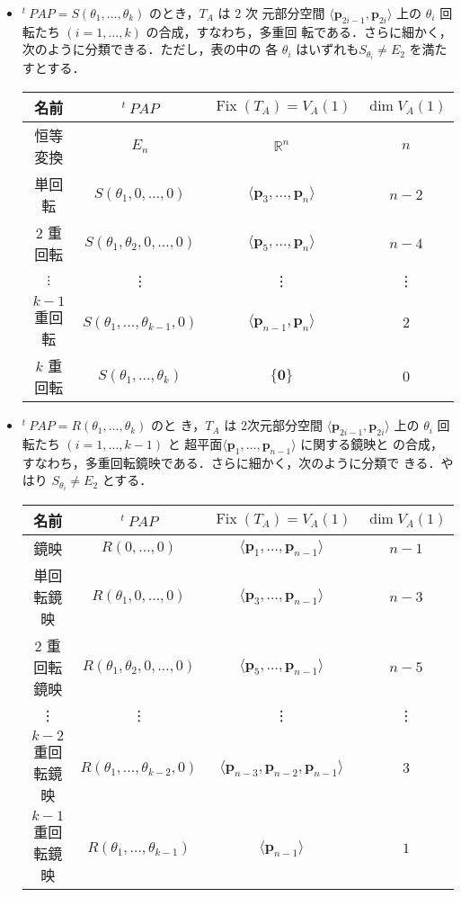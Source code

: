 \documentclass[11pt, uplatex, dvipdfmx, titlepage]{jsarticle}
\newcommand{\trs}[1]{{}^{t}~\!\!#1}
\DeclareMathOperator{\Fix}{Fix}
\theoremstyle{definition}
\begin{document}
\begin{itemize}
\setlength{\itemsep}{1zh}

\item $\trs{P}AP=S(\theta_1, \ldots, \theta_k)$ のとき，$T_A$ は $2$ 次
  元部分空間 $\langle \bm{p}_{2i-1}, \bm{p}_{2i}\rangle
  $ 上の $\theta_i$ 回転たち $(i=1,\ldots, k)$ の合成，すなわち，多重回
  転である．さらに細かく，次のように分類できる．ただし，表の中の
  各 $\theta_i$ はいずれも$ S_{\theta_i} \neq E_2$ を満たすとする．
  \begin{table}[h]
    \centering
    \begin{tabular}[h]{c|c|c|c}
      名前 & $\trs{P}AP$ & $\Fix(T_A)=V_A(1)$ & $\dim V_A(1)$\\ \hline
      恒等変換 & $E_n$ & $\mathbb{R}^n$ & $n$ \\
      単回転 & $S(\theta_1, 0, \ldots, 0)$
                         & $\langle \bm{p}_3, \ldots, \bm{p}_n\rangle $ & $n-2$ \\
      $2$ 重回転 & $S(\theta_1, \theta_2, 0, \ldots, 0)$
                         & $\langle \bm{p}_5, \ldots, \bm{p}_n\rangle$ & $n-4$ \\
      $\vdots$ & \vdots & \vdots & \vdots \\
      $k-1$ 重回転 & $S(\theta_1, \ldots, \theta_{k-1}, 0)$
                         & $\langle \bm{p}_{n-1}, \bm{p}_n \rangle$ & $2$ \\
      $k$ 重回転 & $S(\theta_1, \ldots, \theta_k) $ & $\{\bm{0}\}$ & $0$
    \end{tabular}
  \end{table}

\item $\trs{P}AP = R(\theta_1, \ldots, \theta_k)$ のと
  き，$T_A$ は $2$次元部分空間 $\langle \bm{p}_{2i-1},
  \bm{p}_{2i}\rangle $ 上の $\theta_i$ 回転たち $(i=1,\ldots, k-1)$ と
  超平面$\langle \bm{p}_1, \ldots, \bm{p}_{n-1}\rangle$ に関する鏡映と
  の合成，すなわち，多重回転鏡映である．さらに細かく，次のように分類で
  きる．やはり $S_{\theta_i} \neq E_2$ とする．
  \begin{table}[h]
    \centering
    \begin{tabular}[h]{c|c|c|c}
      名前 & $\trs{P}AP$ & $\Fix(T_A)= V_A(1)$ & $\dim V_A(1)$ \\ \hline
      鏡映 & $R(0, \ldots, 0)$ & $\langle \bm{p}_1, \ldots, \bm{p}_{n-1}\rangle$  & $n-1$ \\
      単回転鏡映 & $R(\theta_1, 0, \ldots, 0)$
                         & $\langle \bm{p}_3, \ldots,  \bm{p}_{n-1}\rangle$ & $n-3$\\
      $2$ 重回転鏡映 & $R(\theta_1, \theta_2, 0, \ldots, 0)$
                         & $\langle \bm{p}_5, \ldots, \bm{p}_{n-1} \rangle$ & $n-5$\\
      \vdots & \vdots & \vdots & \vdots\\
      $k-2$ 重回転鏡映 & $R(\theta_1, \ldots, \theta_{k-2}, 0)$
                         & $\langle \bm{p}_{n-3}, \bm{p}_{n-2}, \bm{p}_{n-1}\rangle$ & $3$ \\
      $k-1$ 重回転鏡映 & $R(\theta_1, \ldots, \theta_{k-1})$ & $\langle \bm{p}_{n-1}\rangle$ & $1$
    \end{tabular}
  \end{table}
  

\end{itemize}
\end{document}
